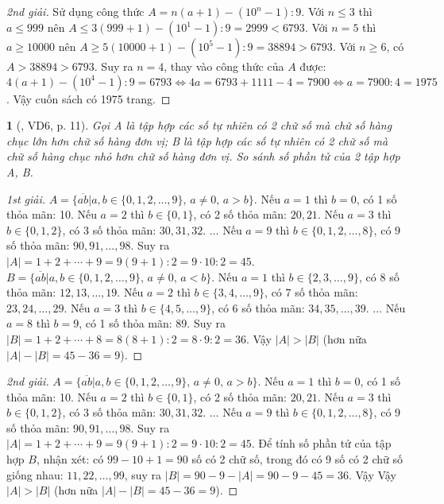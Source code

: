 \documentclass{article}
\newtheorem{baitoan}{}
\begin{document}
\begin{proof}[2nd giải]
	Sử dụng công thức $A = n(a + 1) - (10^n - 1):9$. Với $n\le3$ thì $a\le999$ nên $A\le3(999 + 1) - (10^1 - 1):9 = 2999 < 6793$. Với $n = 5$ thì $a\ge10000$ nên $A\ge5(10000 + 1) - (10^5 - 1):9 = 38894 > 6793$. Với $n\ge6$, có $A > 38894 > 6793$. Suy ra $n = 4$, thay vào công thức của $A$ được: $4(a + 1) - (10^4 - 1):9 = 6793\Leftrightarrow4a = 6793 + 1111 - 4 = 7900\Leftrightarrow a = 7900:4 = 1975$. Vậy cuốn sách có 1975 trang.
\end{proof}

\begin{baitoan}[\cite{Binh_boi_duong_Toan_6_tap_1}, VD6, p. 11]
	Gọi A là tập hợp các số tự nhiên có 2 chữ số mà chữ số hàng chục lớn hơn chữ số hàng đơn vị; B là tập hợp các số tự nhiên có 2 chữ số mà chữ số hàng chục nhỏ hơn chữ số hàng đơn vị. So sánh số phần tử của 2 tập hợp A, B.
\end{baitoan}

\begin{proof}[1st giải]
	$A = \{\overline{ab}|a,b\in\{0,1,2,\ldots,9\},\,a\ne0,\,a > b\}$. Nếu $a = 1$ thì $b = 0$, có 1 số thỏa mãn: 10. Nếu $a = 2$ thì $b\in\{0,1\}$, có 2 số thỏa mãn: $20,21$. Nếu $a = 3$ thì $b\in\{0,1,2\}$, có 3 số thỏa mãn: $30,31,32$. $\ldots$ Nếu $a = 9$ thì $b\in\{0,1,2,\ldots,8\}$, có 9 số thỏa mãn: $90,91,\ldots,98$. Suy ra $|A| = 1 + 2 + \cdots + 9 = 9(9 + 1):2 = 9\cdot10:2 = 45$. $B = \{\overline{ab}|a,b\in\{0,1,2,\ldots,9\},\,a\ne0,\,a < b\}$. Nếu $a = 1$ thì $b\in\{2,3,\ldots,9\}$, có 8 số thỏa mãn: $12,13,\ldots,19$. Nếu $a = 2$ thì $b\in\{3,4,\ldots,9\}$, có 7 số thỏa mãn: $23,24,\ldots,29$. Nếu $a = 3$ thì $b\in\{4,5,\ldots,9\}$, có 6 số thỏa mãn: $34,35,\ldots,39$. $\ldots$ Nếu $a = 8$ thì $b = 9$, có 1 số thỏa mãn: 89. Suy ra $|B| = 1 + 2 + \cdots + 8 = 8(8 + 1):2 = 8\cdot9:2 = 36$. Vậy $|A| > |B|$ (hơn nữa $|A| - |B| = 45 - 36 = 9$).
\end{proof}

\begin{proof}[2nd giải]
	$A = \{\overline{ab}|a,b\in\{0,1,2,\ldots,9\},\,a\ne0,\,a > b\}$. Nếu $a = 1$ thì $b = 0$, có 1 số thỏa mãn: 10. Nếu $a = 2$ thì $b\in\{0,1\}$, có 2 số thỏa mãn: $20,21$. Nếu $a = 3$ thì $b\in\{0,1,2\}$, có 3 số thỏa mãn: $30,31,32$. $\ldots$ Nếu $a = 9$ thì $b\in\{0,1,2,\ldots,8\}$, có 9 số thỏa mãn: $90,91,\ldots,98$. Suy ra $|A| = 1 + 2 + \cdots + 9 = 9(9 + 1):2 = 9\cdot10:2 = 45$. Để tính số phần tử của tập hợp $B$, nhận xét: có $99 - 10 + 1 = 90$ số có 2 chữ số, trong đó có 9 số có 2 chữ số giống nhau: $11,22,\ldots,99$, suy ra $|B| = 90 - 9 - |A| = 90 - 9 - 45 = 36$. Vậy Vậy $|A| > |B|$ (hơn nữa $|A| - |B| = 45 - 36 = 9$).
\end{proof}
\end{document}
